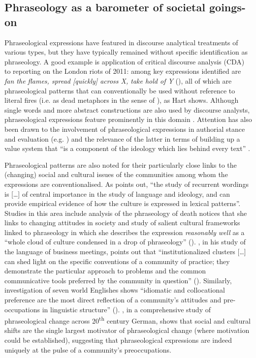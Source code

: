 \documentclass[output=paper]{langscibook}
\begin{document}
\subsection{Phraseology as a barometer of societal goings-on}

Phraseological expressions have featured in discourse analytical treatments of various types, but they have typically remained without specific identification as phraseology. A good example is  application of critical discourse analysis (CDA) to reporting on the London riots of 2011: among key expressions identified are \textit{fan the flames, spread [quickly] across X, take hold of Y} (\citeyear[284--285]{Hart2017}), all of which are phraseological patterns that can conventionally be used without reference to literal fires (i.e. as dead metaphors in the sense of \citealt{LakoffJohnson1980}), as Hart shows. Although single words and more abstract constructions are also used by discourse analysts, phraseological expressions feature prominently in this domain \citep{Stubbs2002}. Attention has also been drawn to the involvement of phraseological expressions in authorial stance and evaluation (e.g. \citealt{Hunston2011,Biber2006}) and the relevance of the latter in terms of building up a value system that ``is a component of the ideology which lies behind every text'' \citep[6]{ThompsonHunston2000}.

Phraseological patterns are also noted for their particularly close links to the (changing) social and cultural issues of the communities among whom the expressions are conventionalised. As \citet[169]{Stubbs1996} points out, “the study of recurrent wordings is […] of central importance in the study of language and ideology, and can provide empirical evidence of how the culture is expressed in lexical patterns”. Studies in this area include  analysis of the phraseology of death notices that she links to changing attitudes in society and  study of salient cultural frameworks linked to phraseology in which she describes the expression \textit{reasonably well} as a “whole cloud of culture condensed in a drop of phraseology” (\citeyear[50]{Wierzbicka2007}). \citet{Handford2010}, in his study of the language of business meetings, points out that “institutionalized clusters […] can shed light on the specific conventions of a community of practice; they demonstrate the particular approach to problems and the common communicative tools preferred by the community in question” (\citeyear[144]{Handford2010}). Similarly,  investigation of seven world Englishes shows “idiomatic and collocational preference are the most direct reflection of a community’s attitudes and pre-occupations in linguistic structure” (\citeyear[439]{Mair2007}). \citet{Buerki2020}, in a comprehensive study of phraseological change across 20\textsuperscript{th} century German, shows that social and cultural shifts are the single largest motivator of phraseological change (where motivation could be established), suggesting that phraseological expressions are indeed uniquely at the pulse of a community’s preoccupations.
\end{document}
